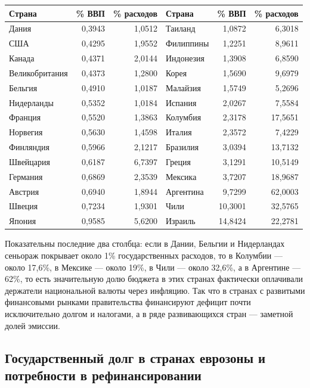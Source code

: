 \documentclass[11pt,a4paper]{article}
\begin{document}
\begin{center}
\footnotesize
\setlength{\tabcolsep}{4pt}
\begin{tabular}{lrr@{\hspace{1.2cm}}lrr}
\toprule
\textbf{Страна} & \textbf{\% ВВП} & \textbf{\% расходов} & \textbf{Страна} & \textbf{\% ВВП} & \textbf{\% расходов}\\
\midrule
Дания & 0,3943 & 1,0512 & Таиланд & 1,0872 & 6,3018\\
США & 0,4295 & 1,9552 & Филиппины & 1,2251 & 8,9611\\
Канада & 0,4371 & 2,0144 & Индонезия & 1,3908 & 6,8590\\
Великобритания & 0,4373 & 1,2800 & Корея & 1,5690 & 9,6979\\
Бельгия & 0,4910 & 1,0187 & Малайзия & 1,5749 & 5,2696\\
Нидерланды & 0,5352 & 1,0184 & Испания & 2,0267 & 7,5584\\
Франция & 0,5520 & 1,3863 & Колумбия & 2,3178 & 17,5651\\
Норвегия & 0,5630 & 1,4598 & Италия & 2,3572 & 7,4229\\
Финляндия & 0,5966 & 2,1217 & Бразилия & 3,0394 & 13,7132\\
Швейцария & 0,6187 & 6,7397 & Греция & 3,1291 & 10,5149\\
Германия & 0,6869 & 2,3539 & Мексика & 3,7207 & 18,9687\\
Австрия & 0,6940 & 1,8944 & Аргентина & 9,7299 & 62,0003\\
Швеция & 0,7234 & 1,9301 & Чили & 10,3001 & 32,5765\\
Япония & 0,9585 & 5,6200 & Израиль & 14,8424 & 22,2781\\
\bottomrule
\end{tabular}
\end{center}

Показательны последние два столбца: если в Дании, Бельгии и Нидерландах сеньораж покрывает около 1\% государственных расходов, то в Колумбии --- около 17,6\%, в Мексике --- около 19\%, в Чили --- около 32,6\%, а в Аргентине --- 62\%, то есть значительную долю бюджета в этих странах фактически оплачивали держатели национальной валюты через инфляцию. Так что в странах с развитыми финансовыми рынками правительства финансируют дефицит почти исключительно долгом и налогами, а в ряде развивающихся стран --- заметной долей эмиссии.

\subsection{Государственный долг в странах еврозоны и потребности в рефинансировании}
\end{document}
